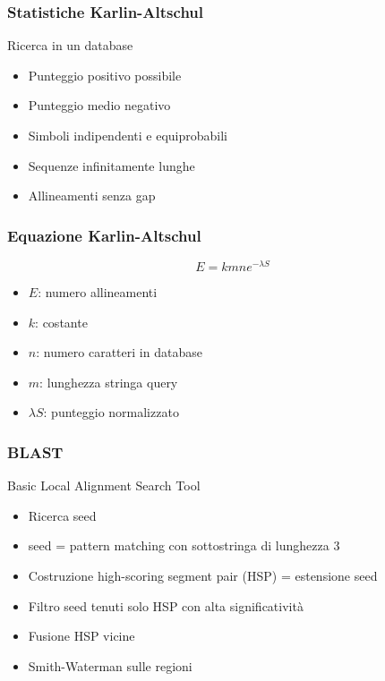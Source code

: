 \begin{frame}[fragile]
\frametitle{Statistiche Karlin-Altschul}
\begin{block}{Ricerca in un database}
\begin{itemize}
\item
Punteggio positivo possibile
\item
Punteggio medio negativo
\item
Simboli indipendenti e equiprobabili
\item
Sequenze infinitamente lunghe
\item
Allineamenti senza gap
\end{itemize}
\end{block}
\end{frame}

\begin{frame}[fragile]
\frametitle{Equazione Karlin-Altschul}
\begin{equation*}
E=kmne^{-\lambda S}
\end{equation*}
\begin{itemize}
\item
$E$: numero allineamenti
\item
$k$: costante
\item
$n$: numero caratteri in database
\item
$m$: lunghezza stringa query
\item
$\lambda S$: punteggio normalizzato
\end{itemize}
\end{frame}

\begin{frame}[fragile]
\frametitle{BLAST}
\begin{block}{Basic Local Alignment Search Tool}
\begin{itemize}
\item
Ricerca seed
\item
seed = pattern matching con sottostringa di lunghezza $3$
\item
Costruzione  high-scoring segment pair (HSP)
= estensione seed
\item
Filtro seed tenuti solo HSP con  alta significatività
\item
Fusione HSP  vicine
\item
Smith-Waterman sulle regioni
\end{itemize}
\end{block}
\end{frame}

